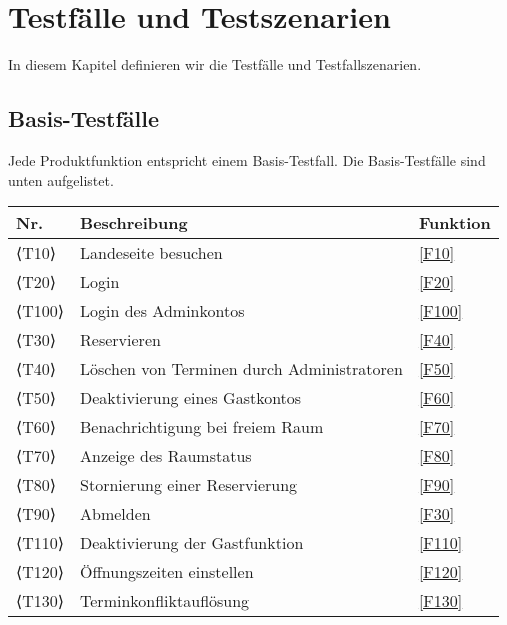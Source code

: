 \chapter{Testfälle und Testszenarien}
\label{chap:test}
In diesem Kapitel definieren wir die Testfälle und Testfallszenarien.

\section{Basis-Testfälle}

Jede Produktfunktion entspricht einem Basis-Testfall. Die Basis-Testfälle sind unten aufgelistet.


\begin{table}[htbp]


  \centering
  \begin{tabularx}{\textwidth}{ l|X|l }
      \textbf{Nr.} & \textbf{Beschreibung} & \textbf{Funktion} \\ \hline\hline
      ⟨T10⟩ & Landeseite besuchen &\ref{F10}\\
      ⟨T20⟩ & Login &\ref{F20} \\
      ⟨T100⟩& Login des Adminkontos &\ref{F100} \\
      ⟨T30⟩ & Reservieren &\ref{F40} \\
      ⟨T40⟩ & Löschen von Terminen durch Administratoren &\ref{F50} \\
      ⟨T50⟩ & Deaktivierung eines Gastkontos &\ref{F60} \\
      ⟨T60⟩ & Benachrichtigung bei freiem Raum &\ref{F70} \\
      ⟨T70⟩ & Anzeige des Raumstatus &\ref{F80} \\
      ⟨T80⟩ & Stornierung einer Reservierung &\ref{F90} \\
      ⟨T90⟩ & Abmelden &\ref{F30} \\
      ⟨T110⟩& Deaktivierung der Gastfunktion &\ref{F110} \\
      ⟨T120⟩& Öffnungszeiten einstellen &\ref{F120} \\
      ⟨T130⟩& Terminkonfliktauflösung &\ref{F130} \\
  \end{tabularx}\label{tab:test_table}
\end{table}

